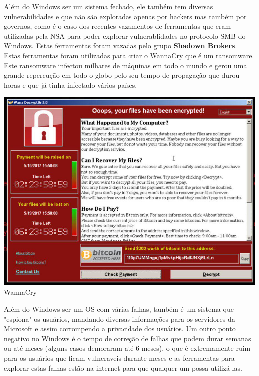 \documentclass[12pt, letterpaper]{report}
\begin{document}
	Além do Windows ser um sistema fechado, ele também tem diversas vulnerabilidades e que não são exploradas apenas por hackers mas também por governos, como é o caso dos recentes vazamentos de ferramentas que eram utilizadas pela NSA para poder explorar vulnerablidades no protocolo SMB do Windows. Estas ferramentas foram vazadas pelo grupo \textbf{Shadown Brokers}. Estas ferramentas foram utilizadas para criar o WannaCry que é um \href{https://criptowiki.miraheze.org/wiki/Ransomwares}{ransomware}. Este ransomware infectou milhares de máquinas em todo o mundo e gerou uma grande repercução em todo o globo pelo seu tempo de propagação que durou horas e que já tinha infectado vários países.\\

\begin{center} %
	\includegraphics[scale=0.8]{wannacry.jpg}\\
	\footnotesize WannaCry %
\end{center}

	Além do Windows ser um OS com várias falhas, também é um sistema que "espiona" os usuários, mandando diversas informações para os servidores da Microsoft e assim corrompendo a privacidade dos usuários. Um outro ponto negativo no Windows é o tempo de correção de falhas que podem durar semanas ou até meses ({\textit alguns casos demoraram até 6 meses}), o que é extremamente ruim para os usuários que ficam vulneraveis durante meses e as ferramentas para explorar estas falhas estão na internet para que qualquer um possa utilizá-las.\\
\end{document}
